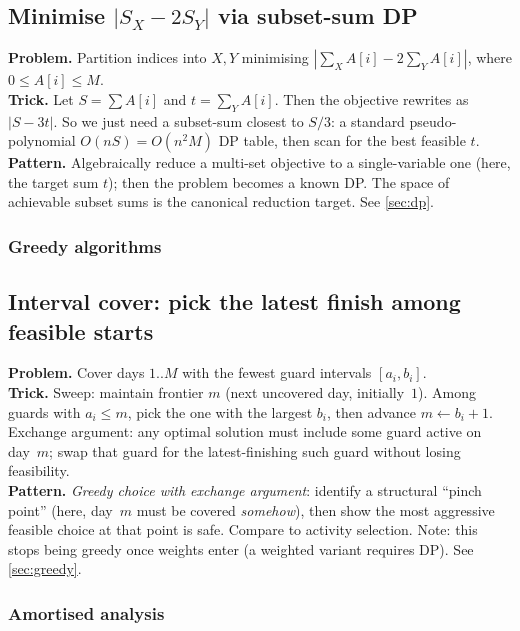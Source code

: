 \subsection{\texorpdfstring{Minimise $|S_X - 2 S_Y|$ via subset-sum DP}{Minimise |S\_X - 2 S\_Y| via subset-sum DP}}
\textbf{Problem.} Partition indices into $X, Y$ minimising $|\sum_{X} A[i] - 2\sum_{Y} A[i]|$, where $0 \le A[i] \le M$.\\
\textbf{Trick.} Let $S = \sum A[i]$ and $t = \sum_Y A[i]$. Then the objective rewrites as $|S - 3t|$. So we just need a subset-sum closest to $S/3$: a standard pseudo-polynomial $O(nS) = O(n^2 M)$ DP table, then scan for the best feasible $t$.\\
\textbf{Pattern.} Algebraically reduce a multi-set objective to a single-variable one (here, the target sum $t$); then the problem becomes a known DP. The space of achievable subset sums is the canonical reduction target. See \cref{sec:dp}.

\subsubsection*{Greedy algorithms}

\subsection{Interval cover: pick the latest finish among feasible starts}
\textbf{Problem.} Cover days $1..M$ with the fewest guard intervals $[a_i, b_i]$.\\
\textbf{Trick.} Sweep: maintain frontier $m$ (next uncovered day, initially~$1$). Among guards with $a_i \leq m$, pick the one with the largest $b_i$, then advance $m \leftarrow b_i + 1$. Exchange argument: any optimal solution must include some guard active on day~$m$; swap that guard for the latest-finishing such guard without losing feasibility.\\
\textbf{Pattern.} \emph{Greedy choice with exchange argument}: identify a structural ``pinch point'' (here, day~$m$ must be covered \emph{somehow}), then show the most aggressive feasible choice at that point is safe. Compare to activity selection. Note: this stops being greedy once weights enter (a weighted variant requires DP). See \cref{sec:greedy}.

\subsubsection*{Amortised analysis}

